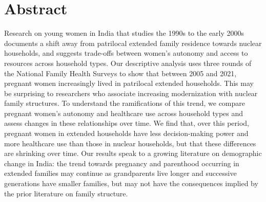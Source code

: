 \section*{Abstract}
Research on young women in India that studies the 1990s to the early 2000s documents a shift away from patrilocal extended family residence towards nuclear households, and suggests trade-offs between women’s autonomy and access to resources across household types.  Our descriptive analysis uses three rounds of the National Family Health Surveys to show that between 2005 and 2021, pregnant women increasingly lived in patrilocal extended households.  This may be surprising to researchers who associate increasing modernization with nuclear family structures.  To understand the ramifications of this trend, we compare pregnant women’s autonomy and healthcare use across household types and assess changes in these relationships over time.  We find that, over this period, pregnant women in extended households have less decision-making power and more healthcare use than those in nuclear households, but that these differences are shrinking over time. Our results speak to a growing literature on demographic change in India: the trend towards pregnancy and parenthood occurring in extended families may continue as grandparents live longer and successive generations have smaller families, but may not have the consequences implied by the prior literature on family structure.